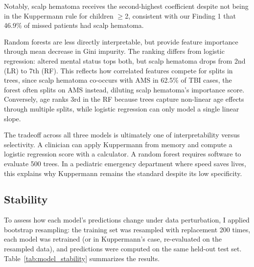 \documentclass[11pt,letterpaper]{article}
\begin{document}
Notably, scalp hematoma receives the second-highest coefficient despite not being in the Kuppermann rule for children $\geq$2, consistent with our Finding 1 that 46.9\% of missed patients had scalp hematoma.

Random forests are less directly interpretable, but provide feature importance through mean decrease in Gini impurity. The ranking differs from logistic regression: altered mental status tops both, but scalp hematoma drops from 2nd (LR) to 7th (RF). This reflects how correlated features compete for splits in trees, since scalp hematoma co-occurs with AMS in 62.5\% of TBI cases, the forest often splits on AMS instead, diluting scalp hematoma's importance score. Conversely, age ranks 3rd in the RF because trees capture non-linear age effects through multiple splits, while logistic regression can only model a single linear slope.

The tradeoff across all three models is ultimately one of interpretability versus selectivity. A clinician can apply Kuppermann from memory and compute a logistic regression score with a calculator. A random forest requires software to evaluate 500 trees. In a pediatric emergency department where speed saves lives, this explains why Kuppermann remains the standard despite its low specificity.


\subsection{Stability}\label{model-stability}

To assess how each model's predictions change under data perturbation, I applied bootstrap resampling: the training set was resampled with replacement 200 times, each model was retrained (or in Kuppermann's case, re-evaluated on the resampled data), and predictions were computed on the same held-out test set. Table~\ref{tab:model_stability} summarizes the results.
\end{document}
